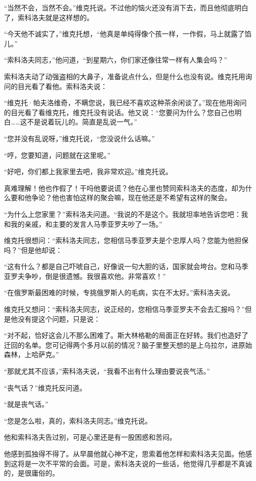 “当然不会，当然不会。”维克托说。不过他的恼火还没有消下去，而且他彻底明白了，索科洛夫就是这样想的。

“今天他不诚实了，”维克托想，“他真是单纯得像个孩­一样，一作假，马上就露了馅儿。”

“索科洛夫同志，”他问道，“到星期六，你们家还像往常一样有人集会吗？”

索科洛夫动了动强盗相的大鼻子，准备说点什么，但是什么也没有说。维克托用询问的目光看了看他。索科洛夫说：

“维克托·帕夫洛维奇，不瞒您说，我已经不喜欢这种茶余闲谈了。”现在他用询问的目光看了看维克托，维克托没有说话。他又说：“您要问为什么？您自己也明白……这不是说着玩儿的。简直是乱说一气。”

“您并没有乱说呀，”维克托说，“您没说什么话嘛。”

“哼，您要知道，问题就在这里呢。”

“好吧，你们都上我家里去吧，我非常欢迎。”维克托说。

真难理解！他也作假了！干吗他要说谎？他在心里也赞同索科洛夫的态度，却为什么要和他争论？他也害怕这样的聚会嘛，现在他还是不希望有这样的聚会。

“为什么上您家里？”索科洛夫问道。“我说的不是这个。我就坦率地告诉您吧：我和我的亲戚，和主要的发言人马季亚罗夫吵了一场。”

维克托很想问：“索科洛夫同志，您相信马季亚罗夫是个忠厚人吗？您能为他担保吗？”但是他却说：

“这有什么？都是自己吓唬自己，好像说一句大胆的话，国家就会垮台。您和马季亚罗夫争吵，倒是很遗憾。我很喜欢他。非常喜欢！”

“在俄罗斯最困难的时候，专挑俄罗斯人的毛病，实在不太好。”索科洛夫说。

维克托又想问：“索科洛夫同志，说正经的，您相信马季亚罗夫不会去汇报吗？”但是他没有提这个问题，只是说：

“对不起，恰好这会儿不那么困难了。斯大林格勒的局面正在好转。我们也造好了迁回的名单。您可记得两个多月以前的情况？脑子里整天想的是上乌拉尔，进原始森林，上哈萨克。”

“那就尤其不应该，”索科洛夫说，“我看不出有什么理由要说丧气活。”

“丧气话？”维克托反问道。

“就是丧气话。”

“您是怎么啦，真的，索科洛夫同志。”维克托说。

他和索科洛夫告过别，可是心里还是有一股困惑和苦闷。

他感到孤独得不得了。从早晨他就心神不定，思索着他怎样和索科洛夫见面。他感到这将是一次不平常的会面。可是，索科洛夫说的一些话，他觉得几乎都是不真诚的，是很庸俗的。


